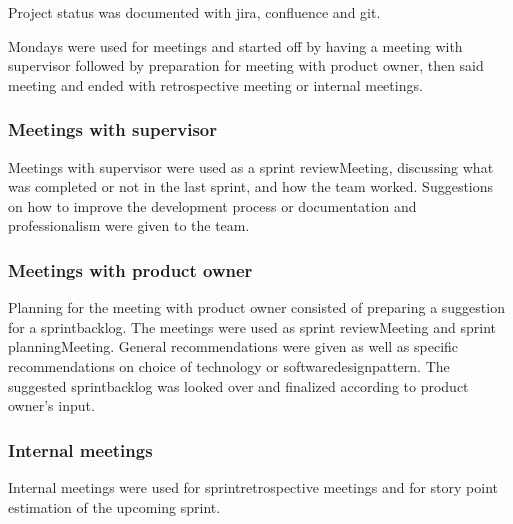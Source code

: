 Project status was documented with \gls{jira}, \gls{confluence} and \gls{git}.

Mondays were used for meetings and started off by having a meeting with supervisor followed by preparation for meeting with product owner, then said meeting and ended with retrospective meeting or internal meetings.

\subsubsection{Meetings with supervisor}
Meetings with supervisor were used as a \gls{sprint} \gls{reviewMeeting}, discussing what was completed or not in the last \gls{sprint}, and how the team worked. Suggestions on how to improve the development process or documentation and professionalism were given to the team.  

\subsubsection{Meetings with product owner}


Planning for the meeting with product owner consisted of preparing a suggestion for a \gls{sprintbacklog}. The meetings were used as \gls{sprint} \gls{reviewMeeting} and \gls{sprint} \gls{planningMeeting}. General recommendations were given as well as specific recommendations on choice of technology or \gls{softwaredesignpattern}. The suggested \gls{sprintbacklog} was looked over and finalized according to product owner's input. 

\subsubsection{Internal meetings}
Internal meetings were used for \gls{sprintretrospective} meetings and for story point estimation of the upcoming \gls{sprint}. 

